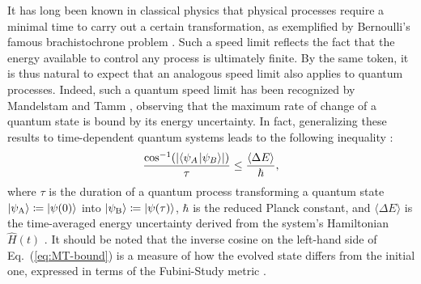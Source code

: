 \documentclass[aps,pra,reprint,a4paper,nofootinbib,superscriptaddress,numbers,longbibliography,showpacs,showkeys,floatfix]{revtex4-1}
\newcommand{\coloneqq}{\mathrel {\mathop : } \mathrel {\mkern -1.2mu}=}
\def\ket#1{\left|#1\right\rangle}
\def\braket#1#2{\left\langle#1\kern-2pt\right.\left|#2\right\rangle}
\renewcommand\textemdash{\leavevmode\unskip\kern0.8pt\rule[0.19\baselineskip]{8pt}{0.4pt}\kern1pt\ignorespaces}
\begin{document}
It has long been known in classical physics that physical processes require a minimal time to carry out a certain transformation, as exemplified by Bernoulli's famous brachistochrone problem \cite{Haws:1995}.
%
Such a speed limit reflects the fact that the energy available to control any process is ultimately finite.
%
%
By the same token, it is thus natural to expect that an analogous speed limit also applies to quantum processes.
%
Indeed, such a quantum speed limit has been recognized by Mandelstam and Tamm \cite{Mandelstam:1945}, observing that the maximum rate of change of a quantum state is bound by its energy uncertainty.
%
In fact, generalizing these results to time-dependent quantum systems leads to the following inequality \cite{Anandan:1990}:
%
\begin{equation}
	\label{eq:MT-bound}
	\frac{\cos^{-1}(\left|\braket{\psi_A}{\psi_B}\right|)}{\tau} \leq \frac{\langle\Delta E\rangle}{\hbar},
\end{equation}
where $\tau$ is the duration of a quantum process transforming a quantum state $\ket{\psi_\text{A}} \coloneqq \ket{\psi(0)}$ into $\ket{\psi_\text{B}} \coloneqq \ket{\psi(\tau)}$,
$\hbar$ is the reduced Planck constant, and $\langle \Delta E \rangle$ is the time-averaged energy uncertainty derived from the system's Hamiltonian $\hat{H}(t)$ \cite{defDeltaH}.
%
%
It should be noted that the inverse cosine on the left-hand side of Eq.~(\ref{eq:MT-bound}) is a measure of how the evolved state differs from the initial one, expressed in terms of the Fubini-Study metric \cite{Bengtsson:2017}.
%
%
%
\end{document}
